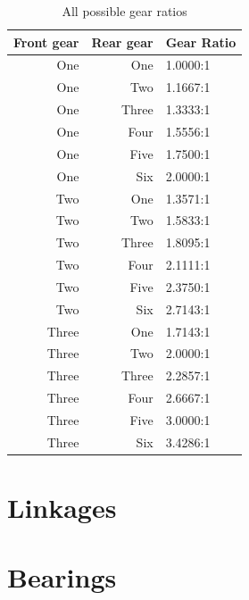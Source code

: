 \documentclass[11pt]{article}
\begin{document}
\begin{table}[H]
	\centering
	\begin{tabular}{|r|r|l|}
		\hline
		\textbf{Front gear} & \textbf{Rear gear} & \textbf{Gear Ratio} \\
		\hline
		One & One & 1.0000:1 \\
		One & Two & 1.1667:1 \\
		One & Three & 1.3333:1 \\
		One & Four & 1.5556:1 \\
		One & Five & 1.7500:1 \\
		One & Six & 2.0000:1 \\
		\hline
		Two & One & 1.3571:1 \\
		Two & Two & 1.5833:1 \\
		Two & Three & 1.8095:1 \\
		Two & Four & 2.1111:1 \\
		Two & Five & 2.3750:1 \\
		Two & Six & 2.7143:1 \\
		\hline
		Three & One & 1.7143:1 \\
		Three & Two & 2.0000:1 \\
		Three & Three & 2.2857:1 \\
		Three & Four & 2.6667:1 \\
		Three & Five & 3.0000:1 \\
		Three & Six & 3.4286:1 \\
		\hline
	\end{tabular}
	\caption{All possible gear ratios}
\end{table}

\section*{Linkages}

\section*{Bearings}
\end{document}
